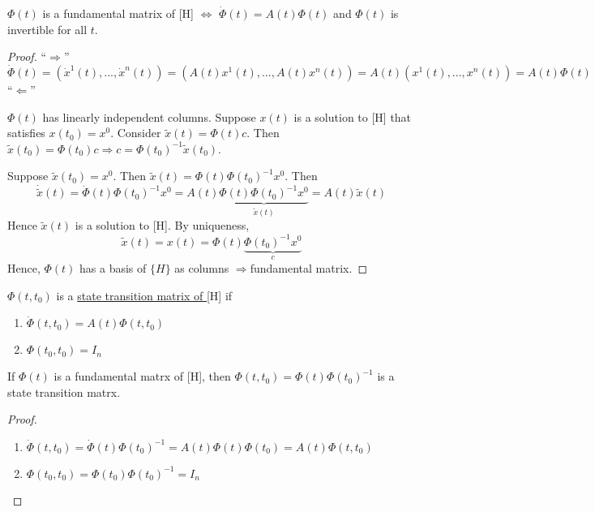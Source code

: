 \documentclass[twoside]{article}
\newcommand\imp{$\Longrightarrow$}
\begin{document}
\begin{lemma}
    $\Phi(t)$ is a fundamental matrix of [H] $\iff$ $\dot{\Phi}(t) = A(t)\Phi(t)$ and $\Phi(t)$ is invertible for all $t$.
\end{lemma}
\begin{proof}
    ``\imp''
    \begin{equation}
        \dot{\Phi}(t) = (\dot{x}^1(t), ..., \dot{x}^n(t)) = (A(t){x}^1(t), ..., A(t){x}^n(t)) = A(t) (x^1(t), ..., x^n(t)) = A(t) \Phi(t)
    \end{equation}
    ``$\Longleftarrow$''

    $\Phi(t)$ has linearly independent columns. Suppose $x(t)$ is a solution to [H] that satisfies $x(t_0) = x^{0}$. Consider $\tilde{x}(t) = \Phi(t)c$. Then $\tilde{x}(t_0) = \Phi(t_0) c \Longrightarrow c = \Phi(t_0)^{-1}\tilde{x}(t_0) $. 

    Suppose $\tilde{x}(t_0) = x^0$. Then $\tilde{x}(t) = \Phi(t) \Phi(t_0)^{-1} x^0 $. Then
    \begin{equation}
        \dot{\tilde{x}}(t) = \dot{\Phi}(t)\Phi(t_0)^{-1} x^0 = A(t) \underbrace{\Phi(t) \Phi(t_0)^{-1} x^0}_{\tilde{x}(t)} = A(t) \tilde{x}(t)
    \end{equation}
    Hence $\tilde{x}(t)$ is a solution to [H]. By uniqueness, \begin{equation}
        \tilde{x}(t) = x(t) = \Phi(t) \underbrace{\Phi(t_0)^{-1}x^0}_{c}
    \end{equation}
    Hence, $\Phi(t)$ has a basis of $\{ H \}$ as columns \imp fundamental matrix. 
\end{proof}


\begin{definition}
    $\Phi(t,t_{0})$ is a \underline{state transition matrix of } [H] if 
    \begin{enumerate}
        \item $\dot{\Phi}(t,t_0) = A(t) {\Phi}(t,t_0)$
        \item ${\Phi}(t_0,t_0) = I_{n}$
    \end{enumerate}
\end{definition}

\begin{theorem}
    If $\Phi(t)$ is a fundamental matrx of [H], then $\Phi(t,t_{0}) = \Phi(t)\Phi(t_0)^{-1}$ is a state transition matrx.
\end{theorem}
\begin{proof}
\begin{enumerate}
    \item $\dot{\Phi}(t,t_0) =  \dot{\Phi}(t)\Phi(t_0)^{-1} = A(t) {\Phi}(t) {\Phi}(t_0) = A(t) {\Phi}(t,t_0)$
    \item ${\Phi}(t_0,t_0) = {\Phi}(t_0){\Phi}(t_0)^{-1} = I_n$
\end{enumerate}
\end{proof}
\end{document}
